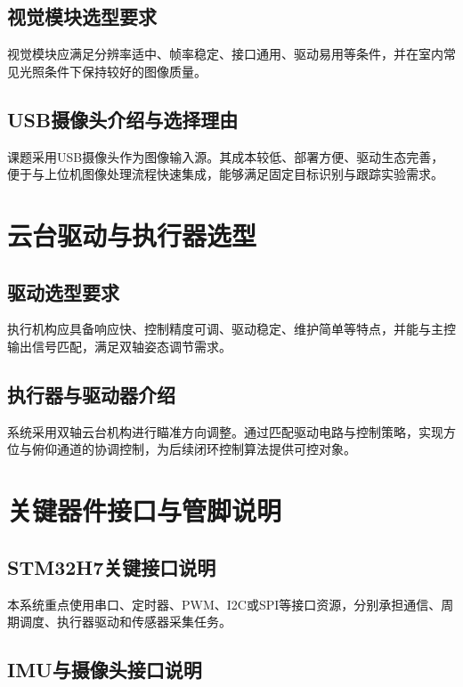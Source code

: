 \subsection{视觉模块选型要求}

视觉模块应满足分辨率适中、帧率稳定、接口通用、驱动易用等条件，并在室内常见光照条件下保持较好的图像质量。

\subsection{USB摄像头介绍与选择理由}

课题采用USB摄像头作为图像输入源。其成本较低、部署方便、驱动生态完善，便于与上位机图像处理流程快速集成，能够满足固定目标识别与跟踪实验需求。

\section{云台驱动与执行器选型}

\subsection{驱动选型要求}

执行机构应具备响应快、控制精度可调、驱动稳定、维护简单等特点，并能与主控输出信号匹配，满足双轴姿态调节需求。

\subsection{执行器与驱动器介绍}

系统采用双轴云台机构进行瞄准方向调整。通过匹配驱动电路与控制策略，实现方位与俯仰通道的协调控制，为后续闭环控制算法提供可控对象。

\section{关键器件接口与管脚说明}

\subsection{STM32H7关键接口说明}

本系统重点使用串口、定时器、PWM、I2C或SPI等接口资源，分别承担通信、周期调度、执行器驱动和传感器采集任务。

\subsection{IMU与摄像头接口说明}

